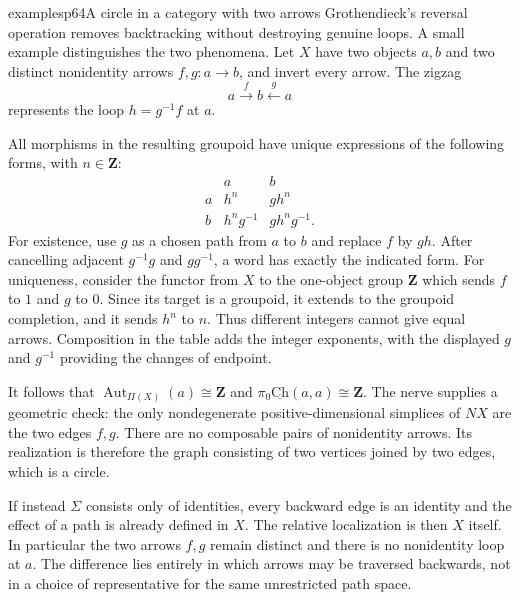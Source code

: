 \begin{dcomment}{examples}{p64}{A circle in a category with two arrows}
Grothendieck's reversal operation removes backtracking without destroying genuine loops. A small example distinguishes the two phenomena. Let $X$ have two objects $a,b$ and two distinct nonidentity arrows $f,g:a\to b$, and invert every arrow. The zigzag
\[
 a\xrightarrow{f}b\xleftarrow{g}a
\]
represents the loop $h=g^{-1}f$ at $a$.

All morphisms in the resulting groupoid have unique expressions of the following forms, with $n\in\mathbf Z$:
\[
\begin{array}{c|cc}
 &a&b\\ \hline
 a&h^n&gh^n\\
 b&h^ng^{-1}&gh^ng^{-1}.
\end{array}
\]
For existence, use $g$ as a chosen path from $a$ to $b$ and replace $f$ by $gh$. After cancelling adjacent $g^{-1}g$ and $gg^{-1}$, a word has exactly the indicated form. For uniqueness, consider the functor from $X$ to the one-object group $\mathbf Z$ which sends $f$ to $1$ and $g$ to $0$. Since its target is a groupoid, it extends to the groupoid completion, and it sends $h^n$ to $n$. Thus different integers cannot give equal arrows. Composition in the table adds the integer exponents, with the displayed $g$ and $g^{-1}$ providing the changes of endpoint.

It follows that $\operatorname{Aut}_{\Pi(X)}(a)\cong\mathbf Z$ and
$\pi_0\underline{\mathrm{Ch}}(a,a)\cong\mathbf Z$. The nerve supplies a geometric check: the only nondegenerate positive-dimensional simplices of $NX$ are the two edges $f,g$. There are no composable pairs of nonidentity arrows. Its realization is therefore the graph consisting of two vertices joined by two edges, which is a circle.

If instead $\Sigma$ consists only of identities, every backward edge is an identity and the effect of a path is already defined in $X$. The relative localization is then $X$ itself. In particular the two arrows $f,g$ remain distinct and there is no nonidentity loop at $a$. The difference lies entirely in which arrows may be traversed backwards, not in a choice of representative for the same unrestricted path space.
\end{dcomment}


